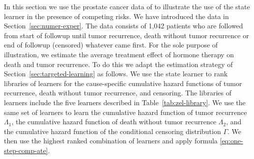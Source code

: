 \documentclass[unnumsec,webpdf,contemporary,large,namedate]{oup-authoring-template}%
\theoremstyle{thmstyleone}%
\theoremstyle{thmstyletwo}%
\theoremstyle{thmstylethree}%
\newcommand{\1}{\mathds{1}}
\begin{document}
In this section we use the prostate cancer data of
\cite{kattan2000pretreatment} to illustrate the use of the state
learner in the presence of competing risks. We have introduced the
data in Section~\ref{sec:numer-exper}. The data consists of 1,042
patients who are followed from start of followup until tumor
recurrence, death without tumor recurrence or end of followup
(censored) whatever came first. For the sole purpose of illustration,
we estimate the average treatment effect of hormone therapy on death
and tumor recurrence. To do this we adapt the estimation strategy of
Section~\ref{sec:targeted-learning} as follows.  We use the state
learner to rank libraries of learners for the cause-specific
cumulative hazard functions of tumor recurrence, death without tumor
recurrence, and censoring.  The libraries of learners include the five
learners described in Table~\ref{tab:zel-library}.  We use the same
set of learners to learn the cumulative hazard function of tumor
recurrence \( \Lambda_1 \), the cumulative hazard function of death
without tumor recurrence \( \Lambda_2 \), and the cumulative hazard
function of the conditional censoring distribution $\Gamma$. 
We then use the highest ranked combination
of learners and apply formula \ref{eq:one-step-comp-ate}.
\end{document}
